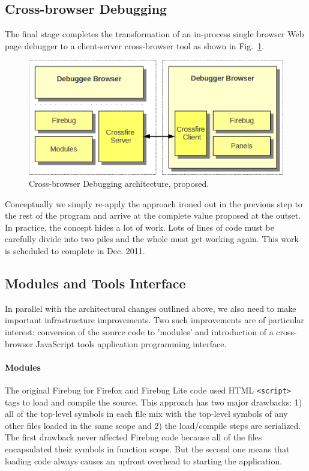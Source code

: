 \subsection{Cross-browser Debugging}
The final stage completes the transformation of an in-process single browser Web
page debugger to a client-server cross-browser tool as shown in
Fig.~\ref{fig:crossbrowser}. \begin{figure}[htp]
  \includegraphics  [width = 86 mm] {figures/crossbrowser.png}
  \caption{Cross-browser Debugging architecture, proposed.}
 \label{fig:crossbrowser}
\end{figure}
Conceptually we simply re-apply the approach ironed out in the previous step to
the rest of the program and arrive at the complete value proposed at the outset.
In practice, the concept hides a lot of work. Lots of lines of code must be
carefully divide into two piles and the whole must get working again. This work
is scheduled to complete in Dec. 2011.

\subsection{Modules and Tools Interface}
In parallel with the architectural changes outlined above, we also need to make
important infrastructure improvements. Two such improvements are of particular
interest: conversion of the source code to 'modules' and introduction of a
cross-browser JavaScript tools application programming interface.


\paragraph{Modules} The original Firebug for Firefox and Firebug Lite code used
HTML \texttt{<script>} tags to load and compile the source. This approach has
two major drawbacks: 1) all of the top-level symbols in each file mix with the
top-level symbols of any other files loaded in the same scope and 2) the
load/compile steps are serialized. The first drawback never affected Firebug
code because all of the files encapsulated their symbols in function scope. But
the second one means that loading code always causes an upfront overhead to
starting the application.


